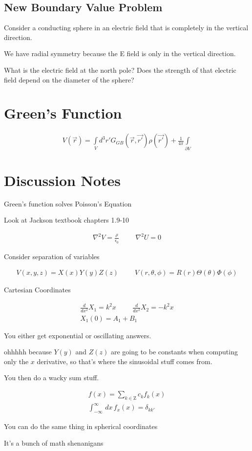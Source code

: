 \documentclass[fleqn]{report}
\newcommand{\hp}{\hspace{1cm}}
\newcommand{\del}{\partial}
\newcommand{\equations} [1] {
\begin{gather*}
#1
\end{gather*}
}
\begin{document}
\subsection{New Boundary Value Problem}
Consider a conducting sphere in an electric field that is 
completely in the vertical direction. 

We have radial symmetry because the E field is only in the vertical direction. 

What is the electric field at the north pole? Does the strength of that 
electric field depend on the diameter of the sphere?

\section{Green's Function}
\equations{
    V(\vec{r})
    =
    \int\limits_V 
    d^3 r' 
    G_{GB} (\vec r, \vec{r'})
    \rho(\vec{r'})
    +
    \frac{1}{4 \pi}
    \int\limits_{\del V}
}

\section{Discussion Notes}
Green's function solves Poisson's Equation 

Look at Jackson textbook chapters 1.9-10
\equations{
    \nabla^2 V = \frac{\rho}{\epsilon_0}
    \hp 
    \nabla^2 U = 0
}

Consider separation of variables 
\equations{
    V(x, y, z)
    =
    X(x) Y(y) Z(z)
    \hp 
    V(r, \theta, \phi)
    =
    R(r) \Theta(\theta) \Phi(\phi)
}

Cartesian Coordinates 
\equations{
    \frac{d}{dx^2} X_1 = k^2 x
    \hp
    \frac{d}{dx^2} X_2 = -k^2 x
    \\
    X_1(0) 
    =
    A_1 + B_1
}
You either get exponential or oscillating answers. 

ohhhhh because $Y(y)$ and $Z(z)$ are going to be constants when 
computing only the $x$ derivative, so that's where the sinusoidal stuff 
comes from. 

You then do a wacky sum stuff. 
\equations{
    f(x) = \sum_{k \in \mathrm Z} c_k f_k(x)
    \\
    \int^{\infty}_{-\infty} \, dx \,
    f_x(x)
    =
    \delta_{kk'}
}

You can do the same thing in spherical coordinates 

It's a bunch of math shenanigans 
\end{document}
